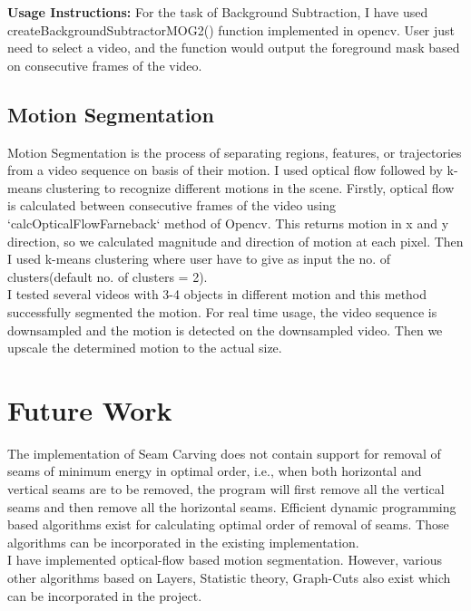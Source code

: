 \documentclass[12pt]{article}
\begin{document}
\textbf{Usage Instructions:} For the task of Background Subtraction, I have used createBackgroundSubtractorMOG2() function implemented in opencv. User just need to select a video, and the function would output the foreground mask based on consecutive frames of the video.\\


\subsection{Motion Segmentation}

Motion Segmentation is the process of separating regions, features, or trajectories from a video sequence on basis of their motion. I used optical flow followed by k-means clustering to recognize different motions in the scene. Firstly, optical flow is calculated between consecutive frames of the video using `calcOpticalFlowFarneback` method of Opencv. This returns motion in x and y direction, so we calculated magnitude and direction of motion at each pixel. Then I used k-means clustering where user have to give as input the no. of clusters(default no. of clusters = 2).\\

I tested several videos with 3-4 objects in different motion and this method successfully segmented the motion. For real time usage, the video sequence is downsampled and the motion is detected on the downsampled video. Then we upscale the determined motion to the actual size.\\


\section{Future Work}

The implementation of Seam Carving does not contain support for removal of seams of minimum energy in optimal order, i.e., when both horizontal and vertical seams are to be removed, the program will first remove all the vertical seams and then remove all the horizontal seams. Efficient dynamic programming based algorithms exist for calculating optimal order of removal of seams. Those algorithms can be incorporated in the existing implementation.\\

I have implemented optical-flow based motion segmentation. However, various other algorithms based on Layers, Statistic theory, Graph-Cuts also exist which can be incorporated in the project.\\
\end{document}
